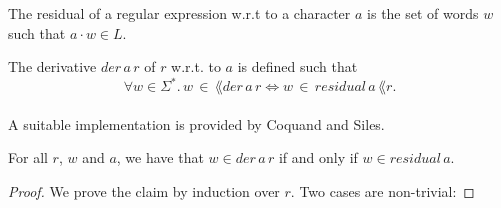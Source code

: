 \begin{definition}{}
    \label{residual}
    The residual of a regular expression w.r.t to a character $a$ is the set of words $w$ such that $a \cdot w \in L$.
\end{definition}

\begin{definition}{}
    \label{residual}
    The derivative $der \,  a \, r$ of $r$ w.r.t. to $a$ is defined such that 
    \[       \forall w \in \Sigma^*. \, w \, \in \, \lang{der \, a \, r} \Leftrightarrow w \, \in \, residual \, a \, \lang{r}. \]
\end{definition}

\paragraph{}
A suitable implementation is provided by Coquand and Siles.



\begin{theorem}
    \label{der_correct}
    For all $r$, $w$ and $a$, we have that $w \in der \, a \, r$ if and only if $w \in residual \, a $.
\end{theorem}

\begin{proof}
    We prove the claim by induction over $r$. Two cases are non-trivial: 
\end{proof}

